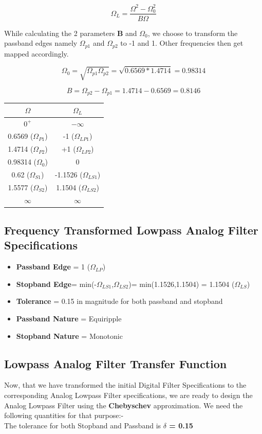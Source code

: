 \documentclass[12pt]{article}
\begin{document}
\[\Omega_{L} = \frac{\Omega^2 - \Omega_{0}^2}{B\Omega}\]

While calculating the 2 parameters \textbf{B} and \textbf{$\Omega_{0}$}, we choose to transform the passband edges namely $\Omega_{p1}$ and $\Omega_{p2}$ to -1 and 1. Other frequencies then get mapped accordingly.

\[\Omega_{0} = \sqrt{\Omega_{p1}\Omega_{p2}} = \sqrt{0.6569*1.4714} = 0.98314\]

\[B = \Omega_{p2} - \Omega_{p1} = 1.4714 - 0.6569 = 0.8146\]

\begin{center}
    \begin{tabular}{|c|c|}
     \hline
    $\Omega$ & $\Omega_{L}$ \\ \hline
    $0^+$ & $-\infty$ \\ \hline
    0.6569 ($\Omega_{P1}$) & -1 ($\Omega_{LP1}$)\\ \hline
    1.4714 ($\Omega_{P2}$) & +1 ($\Omega_{LP2}$)\\ \hline
    0.98314 ($\Omega_{0}$) & 0 \\ \hline
    0.62 ($\Omega_{S1}$) & -1.1526 ($\Omega_{LS1}$) \\ \hline
    1.5577 ($\Omega_{S2}$) & 1.1504 ($\Omega_{LS2}$) \\ \hline
    $\infty$ & $\infty$ \\ \hline
    \end{tabular}
\end{center}

\subsection{Frequency Transformed Lowpass Analog Filter Specifications}

\begin{itemize}
    \item \textbf{Passband Edge} = 1 ($\Omega_{LP}$)
    \item \textbf{Stopband Edge}= min(-$\Omega_{LS1}$,$\Omega_{LS2}$)= min(1.1526,1.1504) = 1.1504 ($\Omega_{LS}$)
    \item\textbf{Tolerance} = 0.15 in magnitude for both passband and stopband
    \item \textbf{Passband Nature} = Equiripple
    \item \textbf{Stopband Nature} = Monotonic
\end{itemize}

\subsection{Lowpass Analog Filter Transfer Function}
Now, that we have transformed the initial Digital Filter Specifications to the corresponding Analog Lowpass Filter specifications, we are ready to design the Analog Lowpass Filter using the \textbf{Chebyschev} approximation. We need the following quantities for that purpose:-\\
The tolerance for both Stopband and Passband is \textbf{$\delta$ = 0.15}
\end{document}
